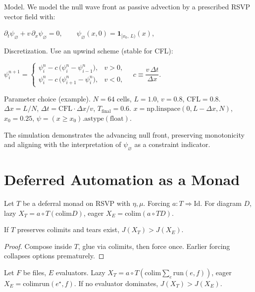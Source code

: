 \documentclass[12pt]{article}
\begin{document}
Model. We model the null wave front as passive advection by a prescribed RSVP vector field with:

$\partial_t \psi_{\varnothing} + v\,\partial_x \psi_{\varnothing} = 0,\qquad
\psi_{\varnothing}(x,0) = \mathbf{1}_{[x_0,\,L)}(x)$,

Discretization. Use an upwind scheme (stable for CFL):

$\psi_i^{n+1} =
\begin{cases}
\psi_i^n - c\,\big(\psi_i^n - \psi_{i-1}^n\big), & v>0,\\[4pt]
\psi_i^n - c\,\big(\psi_{i+1}^n - \psi_i^n\big), & v<0,
\end{cases}
\quad
c \equiv \dfrac{v\,\Delta t}{\Delta x}$.

Parameter choice (example). $N=64$ cells, $L=1.0$, $v=0.8$, CFL$=0.8$. $\Delta x = L / N$, $\Delta t = \mathrm{CFL} \cdot \Delta x / v$, $T_\mathrm{final}=0.6$. $x = \mathrm{np.linspace}(0, L - \Delta x, N)$, $x_0=0.25$, $\psi = (x \geq x_0).\mathrm{astype(float)}$.

The simulation demonstrates the advancing null front, preserving monotonicity and aligning with the interpretation of $\psi_{\varnothing}$ as a constraint indicator.

\section{Deferred Automation as a Monad}
\label{app:deferral}
Let $T$ be a deferral monad on RSVP with $\eta, \mu$. Forcing $a: T \Rightarrow \mathrm{Id}$. For diagram $D$, lazy $X_T = a \circ T(\mathrm{colim} D)$, eager $X_E = \mathrm{colim}(a \circ T D)$.

\begin{theorem}
If $T$ preserves colimits and tears exist, $J(X_T) > J(X_E)$.
\end{theorem}

\begin{proof}
Compose inside $T$, glue via colimits, then force once. Earlier forcing collapses options prematurely.
\end{proof}

\begin{corollary}
Let $F$ be files, $E$ evaluators. Lazy $X_T = a \circ T(\mathrm{colim} \sum_e \mathrm{run}(e,f))$, eager $X_E = \mathrm{colim} \mathrm{run}(e^\star,f)$. If no evaluator dominates, $J(X_T) > J(X_E)$.
\end{corollary}
\end{document}
